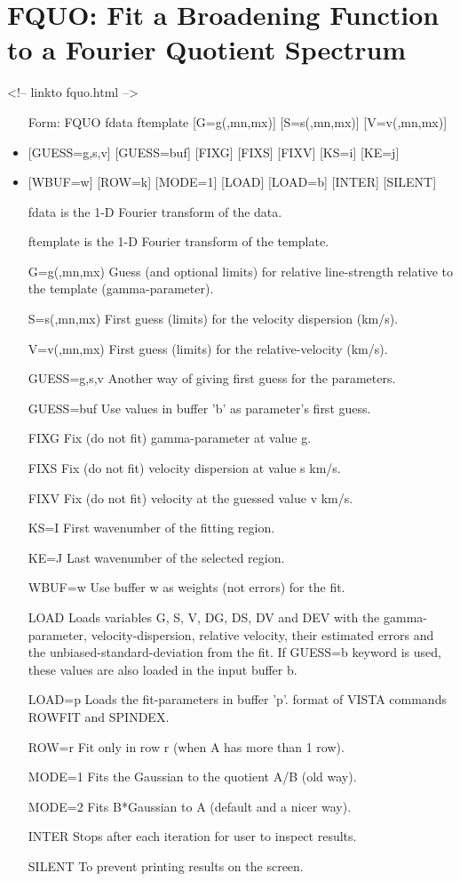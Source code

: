 \section{FQUO: Fit a Broadening Function to a Fourier Quotient Spectrum}
\begin{rawhtml}
<!-- linkto fquo.html -->
\end{rawhtml}
\begin{itemize}
  \item[Form: FQUO fdata ftemplate {[G=g(,mn,mx)]} {[S=s(,mn,mx)]} 
       {[V=v(,mn,mx)]}\hfill]{}
  \item{{[GUESS=g,s,v]} {[GUESS=buf]} {[FIXG]} {[FIXS]} {[FIXV]} {[KS=i]} 
       {[KE=j]}}
  \item{{[WBUF=w]} {[ROW=k]} {[MODE=1]} {[LOAD]} {[LOAD=b]} {[INTER]} 
       {[SILENT]}}
  \item[fdata]{is the 1-D Fourier transform of the data.}
  \item[ftemplate]{is the 1-D Fourier transform of the template.}
  \item[G=g(,mn,mx)]{Guess (and optional limits) for relative line-strength
       relative to the template (gamma-parameter).}
  \item[S=s(,mn,mx)]{First guess (limits) for the velocity dispersion (km/s).}
  \item[V=v(,mn,mx)]{First guess (limits) for the relative-velocity (km/s).}
  \item[GUESS=g,s,v]{Another way of giving first guess for the parameters.}
  \item[GUESS=buf]{Use values in buffer 'b' as parameter's first guess.}
  \item[FIXG]{Fix (do not fit) gamma-parameter at value g.}
  \item[FIXS]{Fix (do not fit) velocity dispersion at value s km/s.}
  \item[FIXV]{Fix (do not fit) velocity at the guessed value v km/s.}
  \item[KS=I]{First wavenumber of the fitting region.}
  \item[KE=J]{Last wavenumber of the selected region.}
  \item[WBUF=w]{Use buffer w as weights (not errors) for the fit.}
  \item[LOAD]{Loads variables G, S, V, DG, DS, DV and DEV with the
       gamma-parameter, velocity-dispersion, relative velocity,
       their estimated errors and the unbiased-standard-deviation
       from the fit. If GUESS=b keyword is used, these values
       are also loaded in the input buffer b.}
  \item[LOAD=p]{Loads the fit-parameters in buffer 'p'.
       format of VISTA commands ROWFIT and SPINDEX.}
  \item[ROW=r]{Fit only in row r (when A has more than 1 row).}
  \item[MODE=1]{Fits the Gaussian to the quotient A/B (old way).}
  \item[MODE=2]{Fits B*Gaussian to A (default and a nicer way).}
  \item[INTER]{Stops after each iteration for user to inspect results.}
  \item[SILENT]{To prevent printing results on the screen.}
\end{itemize}

